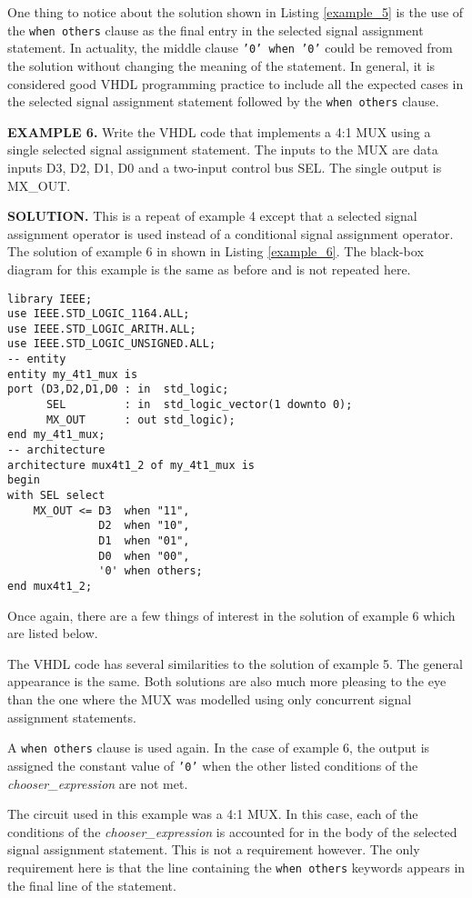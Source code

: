 One thing to notice about the solution shown in Listing \ref{example_5} is the use of the \texttt{when others} clause as the final entry in the selected signal assignment statement. In actuality, the middle clause \texttt{'0' when '0'} could be removed from the solution without changing the meaning of the statement. In general, it is considered good VHDL programming practice to include all the expected cases in the selected signal assignment statement followed by the \texttt{when others} clause.
\begin{leftbar}
\noindent
\textbf{EXAMPLE 6.}
Write the VHDL code that implements a 4:1 MUX using a single selected signal assignment statement. The inputs to the MUX are data inputs D3, D2, D1, D0 and a two-input control bus SEL. The single output is MX\_OUT.
\end{leftbar}
\noindent
\textbf{SOLUTION.} This is a repeat of example 4 except that a selected signal assignment operator is used instead of a conditional signal assignment operator. The solution of example 6 in shown in Listing \ref{example_6}. The black-box diagram for this example is the same as before and is not repeated here.
\begin{lstlisting}[label=example_6, caption=Solution of example 6.]
library IEEE;
use IEEE.STD_LOGIC_1164.ALL;
use IEEE.STD_LOGIC_ARITH.ALL;
use IEEE.STD_LOGIC_UNSIGNED.ALL;
-- entity
entity my_4t1_mux is
port (D3,D2,D1,D0 : in  std_logic;
      SEL         : in  std_logic_vector(1 downto 0);
      MX_OUT      : out std_logic);
end my_4t1_mux;
-- architecture
architecture mux4t1_2 of my_4t1_mux is
begin
with SEL select
	MX_OUT <= D3  when "11",
	          D2  when "10",
	          D1  when "01",
	          D0  when "00",
	          '0' when others;
end mux4t1_2;
\end{lstlisting}

Once again, there are a few things of interest in the solution of example 6 which are listed below.
\begin{my_list}
\item The VHDL code has several similarities to the solution of example 5. The general appearance is the same. Both solutions are also much more pleasing to the eye than the one where the MUX was modelled using only concurrent signal assignment statements.
\item A \texttt{when others} clause is used again. In the case of example 6, the output is assigned the constant value of \texttt{'0'} when the other listed conditions of the \textit{chooser\_expression} are not met.
\item The circuit used in this example was a 4:1 MUX. In this case, each of the conditions of the \textit{chooser\_expression} is accounted for in the body of the selected signal assignment statement. This is not a requirement however. The only requirement here is that the line containing the \texttt{when others} keywords appears in the final line of the statement.
\end{my_list}

